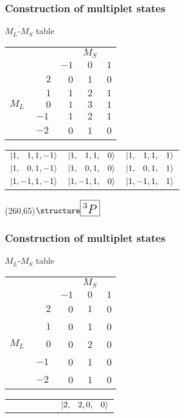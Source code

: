 \begin{frame}[t]
  \frametitle{Construction of multiplet states}
  \footnotesize
  $M_L$-$M_S$ table
  \begin{center}
  \begin{tabular}{c c|r c c}
        &  &  & $M_S$ &  \\
        &  & $-1$ & $0$ & $1$ \\ \hline
        & $\phantom{-}2$ & 0 & 1 & 0  \\
        & $\phantom{-}1$ & $\boxed{1}$ & $\boxed{2}$ & $\boxed{1}$ \\
  $M_L$ & $\phantom{-}0$ & $\boxed{1}$ & $\boxed{3}$ & $\boxed{1}$ \\
        & $-1$ & $\boxed{1}$ & $\boxed{2}$ & $\boxed{1}$ \\
        & $-2$ & 0 & 1 & 0  \\
  \end{tabular}
  \end{center}
  \begin{center}
  \begin{tabular}{r r r}
  $\Ket{1,\phantom{-}1,1,-1}$ & $\Ket{1,\phantom{-}1,1,\phantom{-}0}$ & $\Ket{1,\phantom{-}1,1,\phantom{-}1}$ \\
  $\Ket{1,\phantom{-}0,1,-1}$ & $\Ket{1,\phantom{-}0,1,\phantom{-}0}$ & $\Ket{1,\phantom{-}0,1,\phantom{-}1}$ \\
  $\Ket{1,-1,1,-1}$ & $\Ket{1,-1,1,\phantom{-}0}$ & $\Ket{1,-1,1,\phantom{-}1}$ \\
  \end{tabular}
  \end{center}
  
  \Put(260,65){$\emph{\Large \boxed{{^3P}}}$}
\end{frame}

\begin{frame}[t]
  \frametitle{Construction of multiplet states}
  \footnotesize
  $M_L$-$M_S$ table
  \begin{center}
  \begin{tabular}{c c|r c c}
        &  &  & $M_S$ & \\
        &  & $-1$ & $0$ & $1$ \\ \hline
        & $\phantom{-}2$ & 0 & $\boxed{1}$ & 0 \\
        & $\phantom{-}1$ & 0 & 1 & 0 \\
  $M_L$ & $\phantom{-}0$ & 0 & 2 & 0 \\
        & $-1$ & 0 & 1 & 0 \\
        & $-2$ & 0 & 1 & 0 \\
  \end{tabular}
  \end{center}
  
  \vspace{-0.5em}
  \begin{center}
  \begin{tabular}{r}
  $\qquad\qquad\qquad\Ket{2,\phantom{-}2,0,\phantom{-}0}$
  \end{tabular}
  \end{center}
\end{frame}

